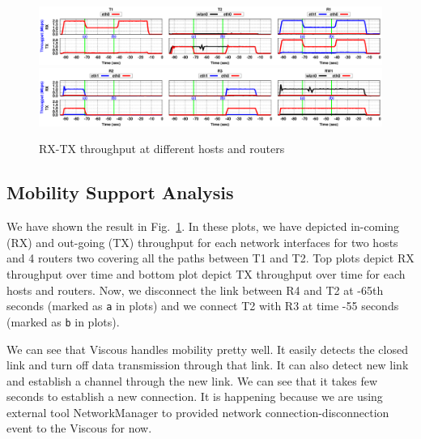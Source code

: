 \begin{figure}[h]
	\centering
	\includegraphics[width=\linewidth]{img/mobility/T1-T2-R1.eps}
	\includegraphics[width=\linewidth]{img/mobility/R2-R3-RW1.eps}
	\caption{\label{fig:mobility_res}RX-TX throughput at different hosts and routers}
\end{figure}


\subsection{Mobility Support Analysis}

We have shown the result in Fig.~\ref{fig:mobility_res}. In these plots, we have depicted in-coming (RX) and out-going (TX) throughput for each network interfaces for two hosts and 4 routers two covering all the paths between T1 and T2. Top plots depict RX throughput over time and bottom plot depict TX throughput over time for each hosts and routers. Now, we disconnect the link between R4 and T2 at -65th seconds (marked as {\tt a} in plots) and we connect T2 with R3 at time -55 seconds (marked as {\tt b} in plots).

We can see that Viscous handles mobility pretty well. It easily detects the closed link and turn off data transmission through that link. It can also detect new link and establish a channel through the new link. We can see that it takes few seconds to establish a new connection. It is happening because we are using external tool NetworkManager to provided network connection-disconnection event to the Viscous for now.
